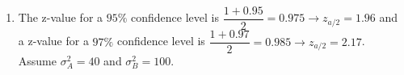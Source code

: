 \documentclass[12pt]{book}
\begin{document}
\begin{enumerate}
\begin{enumerate}
        
        
        
        \item %
        
        
        The z-value for a $95\%$ confidence level is $\dfrac{1+0.95}{2} = 0.975 \xrightarrow[]{} z_{a/2} = 1.96$ and a z-value for a $97\%$ confidence level is $\dfrac{1+0.97}{2} = 0.985 \xrightarrow[]{} z_{a/2} = 2.17$. Assume $\sigma^2_A = 40$ and $\sigma^2_B = 100$.
        

\end{enumerate}
\end{enumerate}
\end{document}
